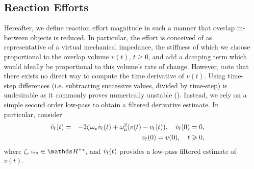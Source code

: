 \subsection{Reaction Efforts} \label{sec:reaction_efforts}
%
Hereafter, we define reaction effort magnitude in such a manner that overlap in-between objects is reduced. In particular, the effort is conceived of as representative of a virtual mechanical impedance, the stiffness of which we choose proportional to the overlap volume $v(t)$, $t\geqslant0$, and add a damping term which would ideally be proportional to this volume's rate of change. However, note that there exists no direct way to compute the time derivative of $v(t)$. Using time-step differences (i.e. subtracting successive values, divided by time-step) is undesirable as it commonly proves numerically unstable (\cite{kagiwada2013numerical}). Instead, we rely on a simple second order low-pass to obtain a filtered derivative estimate. In particular, consider
%
\begin{eqnarray}
\ddot v_{\rm f}(t) &=& -2 \zeta \omega_{\rm n} \dot v_{\rm f}(t) + \omega_{\rm n}^2 (v(t) -v_{\rm f}(t)), \quad \dot v_{\rm f}(0)=0,\nonumber\\
                   & & \hspace{1.05in}  v_{\rm f}(0)=v(0), \quad  t\geqslant0, \label{eq:lowpass}
\end{eqnarray}
%
\noindent where $\zeta$, $\omega_{\rm n}\in \mathds R^{+*}$, and $\dot v_{\rm f}(t)$ provides a low-pass filtered estimate of $\dot v(t)$.

